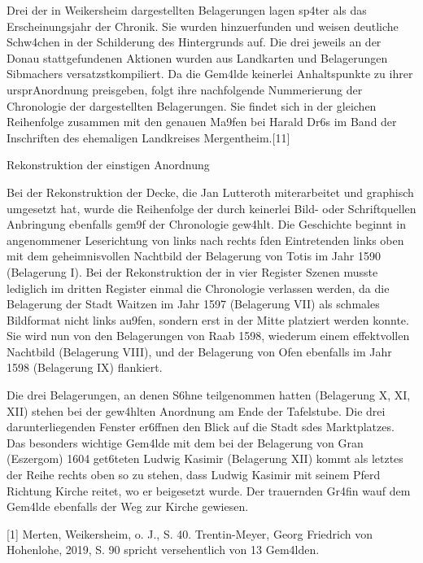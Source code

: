 \documentclass[
  a4paper,
  portrait]{book}
\begin{document}
Drei der in Weikersheim dargestellten Belagerungen lagen sp\xa4ter
als das Erscheinungsjahr der Chronik. Sie wurden hinzuerfunden und
weisen deutliche Schw\xa4chen in der Schilderung des Hintergrunds
auf. Die drei jeweils an der Donau stattgefundenen Aktionen wurden aus
Landkarten und Belagerungen Sibmachers
versatzst\xbcckhaft kompiliert. Da die Gem\xa4lde keinerlei
Anhaltspunkte zu ihrer urspr\xbcnglichen Anordnung preisgeben, folgt
ihre nachfolgende Nummerierung der Chronologie der dargestellten
Belagerungen. Sie findet sich in der gleichen Reihenfolge zusammen mit
den genauen Ma\x9fen bei Harald Dr\xb6s im Band der Inschriften
des ehemaligen Landkreises Mergentheim.{[}11{]}

Rekonstruktion der einstigen Anordnung

Bei der Rekonstruktion der Decke, die Jan Lutteroth miterarbeitet und
graphisch umgesetzt hat, wurde die Reihenfolge der durch keinerlei Bild-
oder Schriftquellen \xbcberlieferten Anbringung ebenfalls
gem\x9f der Chronologie gew\xa4hlt. Die Geschichte
beginnt in angenommener Leserichtung von links nach rechts
f\xbcr den Eintretenden links oben mit dem geheimnisvollen Nachtbild
der Belagerung von Totis im Jahr 1590 (Belagerung I). Bei der
Rekonstruktion der in vier Register \xbcbereinanderliegenden Szenen
musste lediglich im dritten Register einmal die Chronologie verlassen
werden, da die Belagerung der Stadt Waitzen im Jahr 1597 (Belagerung
VII) als schmales Bildformat nicht links au\x9fen, sondern erst in
der Mitte platziert werden konnte. Sie wird nun von den Belagerungen von
Raab 1598, wiederum einem effektvollen Nachtbild (Belagerung VIII), und
der Belagerung von Ofen ebenfalls im Jahr 1598 (Belagerung IX)
flankiert.

Die drei Belagerungen, an denen S\xb6hne teilgenommen hatten
(Belagerung X, XI, XII) stehen bei der gew\xa4hlten Anordnung am
Ende der Tafelstube. Die drei darunterliegenden Fenster er\xb6ffnen
den Blick auf die Stadt s\xbcdlich des Marktplatzes. Das besonders
wichtige Gem\xa4lde mit dem bei der Belagerung von Gran (Eszergom)
1604 get\xb6teten Ludwig Kasimir (Belagerung XII) kommt als letztes
der Reihe rechts oben so zu stehen, dass Ludwig Kasimir mit seinem Pferd
Richtung Kirche reitet, wo er beigesetzt wurde. Der trauernden
Gr\xa4fin w\xbcrde auf dem Gem\xa4lde ebenfalls der Weg zur
Kirche gewiesen.

{[}1{]} Merten, Weikersheim, o. J., S. 40. Trentin-Meyer, Georg
Friedrich von Hohenlohe, 2019, S. 90 spricht versehentlich von 13
Gem\xa4lden.
\end{document}

